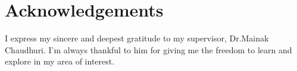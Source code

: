 \chapter*{Acknowledgements}


I express my sincere and deepest gratitude to my supervisor, Dr.Mainak Chaudhuri. I’m always thankful to him for giving me the
freedom to  learn and explore in my area of interest. 

\vspace*{0.4in}
\noindent \hfill \textbf{\authorname}